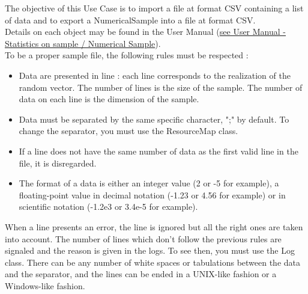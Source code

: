 \renewcommand{\filename}{docUC_InputWithData_CSV.tex}
\renewcommand{\filetitle}{UC : Import / Export data from a file at format CSV (Comma Separated Value)}

\HeaderIIILevel





The objective of this Use Case is to import a file at format CSV containing a list of data and to export a NumericalSample into a file at format CSV. \\



Details on each object may be found in the User Manual  (\href{OpenTURNS_UserManual_TUI.pdf}{see User Manual - Statistics on sample / Numerical Sample}).\\


To be a proper sample file, the following rules must be respected :
\begin{itemize}
\item Data are presented in line : each line corresponds to the realization of the random vector. The number of lines is the size of the sample. The number of data on each line is the dimension of the sample.
\item Data must be separated by the same specific character, ";" by default. To change the separator, you must use the ResourceMap class.
\item If a line does not have the same number of data as the first valid line in the file, it is disregarded.
\item The format of a data is either an integer value (2 or -5 for example), a floating-point value in decimal notation (-1.23 or 4.56 for example) or in scientific notation (-1.2e3 or 3.4e-5 for example).
\end{itemize}

When a line presents an error, the line is ignored but all the right ones are taken into account. The number of lines which don't follow the previous rules are signaled and the reason is given in the logs. To see then, you must use the Log class. There can be any number of white spaces or tabulations between the data and the separator, and the lines can be ended in a UNIX-like fashion or a Windows-like fashion.

